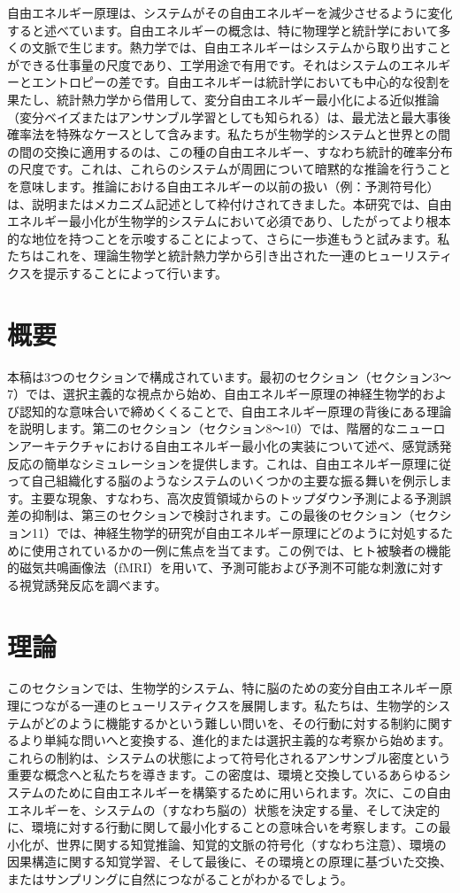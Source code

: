 \documentclass{article}
\begin{document}
自由エネルギー原理は、システムがその自由エネルギーを減少させるように変化すると述べています。自由エネルギーの概念は、特に物理学と統計学において多くの文脈で生じます。熱力学では、自由エネルギーはシステムから取り出すことができる仕事量の尺度であり、工学用途で有用です。それはシステムのエネルギーとエントロピーの差です。自由エネルギーは統計学においても中心的な役割を果たし、統計熱力学から借用して、変分自由エネルギー最小化による近似推論（変分ベイズまたはアンサンブル学習としても知られる）は、最尤法と最大事後確率法を特殊なケースとして含みます。私たちが生物学的システムと世界との間の間の交換に適用するのは、この種の自由エネルギー、すなわち統計的確率分布の尺度です。これは、これらのシステムが周囲について暗黙的な推論を行うことを意味します。推論における自由エネルギーの以前の扱い（例：予測符号化）は、説明またはメカニズム記述として枠付けされてきました。本研究では、自由エネルギー最小化が生物学的システムにおいて必須であり、したがってより根本的な地位を持つことを示唆することによって、さらに一歩進もうと試みます。私たちはこれを、理論生物学と統計熱力学から引き出された一連のヒューリスティクスを提示することによって行います。


\section{概要}
本稿は3つのセクションで構成されています。最初のセクション（セクション3～7）では、選択主義的な視点から始め、自由エネルギー原理の神経生物学的および認知的な意味合いで締めくくることで、自由エネルギー原理の背後にある理論を説明します。第二のセクション（セクション8～10）では、階層的なニューロンアーキテクチャにおける自由エネルギー最小化の実装について述べ、感覚誘発反応の簡単なシミュレーションを提供します。これは、自由エネルギー原理に従って自己組織化する脳のようなシステムのいくつかの主要な振る舞いを例示します。主要な現象、すなわち、高次皮質領域からのトップダウン予測による予測誤差の抑制は、第三のセクションで検討されます。この最後のセクション（セクション11）では、神経生物学的研究が自由エネルギー原理にどのように対処するために使用されているかの一例に焦点を当てます。この例では、ヒト被験者の機能的磁気共鳴画像法（fMRI）を用いて、予測可能および予測不可能な刺激に対する視覚誘発反応を調べます。


\section{理論}
このセクションでは、生物学的システム、特に脳のための変分自由エネルギー原理につながる一連のヒューリスティクスを展開します。私たちは、生物学的システムがどのように機能するかという難しい問いを、その行動に対する制約に関するより単純な問いへと変換する、進化的または選択主義的な考察から始めます。これらの制約は、システムの状態によって符号化されるアンサンブル密度という重要な概念へと私たちを導きます。この密度は、環境と交換しているあらゆるシステムのために自由エネルギーを構築するために用いられます。次に、この自由エネルギーを、システムの（すなわち脳の）状態を決定する量、そして決定的に、環境に対する行動に関して最小化することの意味合いを考察します。この最小化が、世界に関する知覚推論、知覚的文脈の符号化（すなわち注意）、環境の因果構造に関する知覚学習、そして最後に、その環境との原理に基づいた交換、またはサンプリングに自然につながることがわかるでしょう。
\end{document}

